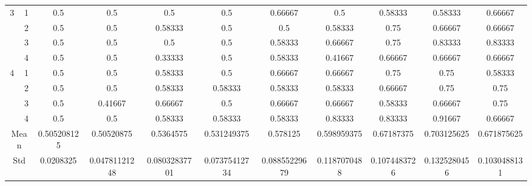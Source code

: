 \documentclass[draft,dvipsnames]{drexel-thesis}
\begin{document}
\begin{thesis}
\begin{table}[!t]
{\begin{tabular}{|c|c|c|c|c|c|c|c|c|c|c|}
\multirow{4}{*}{3}    & 1                   & 0.5         & 0.5           & 0.5           & 0.5           & 0.66667       & 0.5          & 0.58333      & 0.58333      & 0.66667      \\ \cline{2-11}
                      & 2                   & 0.5         & 0.5           & 0.58333       & 0.5           & 0.5           & 0.58333      & 0.75         & 0.66667      & 0.66667      \\ \cline{2-11}
                      & 3                   & 0.5         & 0.5           & 0.5           & 0.5           & 0.58333       & 0.66667      & 0.75         & 0.83333      & 0.83333      \\ \cline{2-11}
                      & 4                   & 0.5         & 0.5           & 0.33333       & 0.5           & 0.58333       & 0.41667      & 0.66667      & 0.66667      & 0.66667      \\ \hline
\multirow{4}{*}{4}    & 1                   & 0.5         & 0.5           & 0.58333       & 0.5           & 0.66667       & 0.66667      & 0.75         & 0.75         & 0.58333      \\ \cline{2-11}
                      & 2                   & 0.5         & 0.5           & 0.58333       & 0.58333       & 0.58333       & 0.58333      & 0.66667      & 0.75         & 0.75         \\ \cline{2-11}
                      & 3                   & 0.5         & 0.41667       & 0.66667       & 0.5           & 0.66667       & 0.66667      & 0.58333      & 0.66667      & 0.75         \\ \cline{2-11}
                      & 4                   & 0.5         & 0.5           & 0.58333       & 0.58333       & 0.58333       & 0.83333      & 0.83333      & 0.91667      & 0.66667      \\ \hline
\multicolumn{2}{|c|}{Mean}                  & 0.505208125 & 0.50520875    & 0.5364575     & 0.531249375   & 0.578125      & 0.598959375  & 0.67187375   & 0.703125625  & 0.671875625  \\ \hline
\multicolumn{2}{|c|}{Std}                   & 0.0208325   & 0.04781121248 & 0.08032837701 & 0.07375412734 & 0.08855229679 & 0.1187070488 & 0.1074483726 & 0.1325280456 & 0.1030488131 \\ \hline
\end{tabular}}
\end{table}


\end{thesis}
\end{document}
